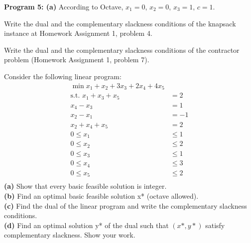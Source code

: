 \documentclass[fleqn]{homework}
\begin{document}
\begin{problem}{2}
    \textbf{Program 5: (a)} According to Octave, $x_1 = 0$, $x_2 = 0$,
    $x_3 = 1$, $c = 1$.

  \end{problem}

  \begin{problem}{3}
    \begin{question}
      Write the dual and the complementary slackness conditions of the knapsack
      instance at Homework Assignment 1, problem 4.
    \end{question}
  \end{problem}

  \begin{problem}{4}
    \begin{question}
      Write the dual and the complementary slackness conditions of the
      contractor problem (Homework Assignment 1, problem 7).
    \end{question}
  \end{problem}

  \begin{problem}{5}
    \begin{question}
      Consider the following linear program:
      \begin{align*}
        \min x_1 + x_2 + 3x_3 + 2x_4 + 4x_5 & \\
        \text{s.t. } x_1 + x_3 + x_5 &= 2 \\
        x_4 - x_3 &= 1 \\
        x_2 - x_1 &= -1 \\
        x_2 + x_4 + x_5 &= 2 \\
        0 \le x_1 &\le 1 \\
        0 \le x_2 &\le 2 \\
        0 \le x_3 &\le 1 \\
        0 \le x_4 &\le 3 \\
        0 \le x_5 &\le 2 \\
      \end{align*}
      \textbf{(a)} Show that every basic feasible solution is integer.\\
      \textbf{(b)} Find an optimal basic feasible solution x* (octave allowed).\\
      \textbf{(c)} Find the dual of the linear program and write the
      complementary slackness conditions.\\
      \textbf{(d)} Find an optimal solution y* of the dual such that $(x*, y*)$
      satisfy complementary slackness. Show your work.\\
    \end{question}
  \end{problem}
\end{document}
